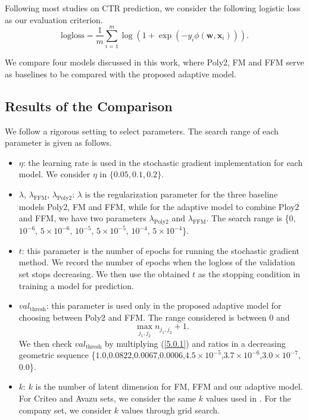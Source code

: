 Following most studies on CTR prediction, we consider the following logistic loss as our evaluation criterion.
\begin{equation}
\text{logloss}=\frac1{m}\sum_{i=1}^{m} \log(1+\exp(-y_{i}\phi(\boldsymbol{w}, \boldsymbol{x}_{i}))).
\end{equation}

We compare four models discussed in this work, where Poly2, FM and FFM serve as baselines to be compared with the proposed adaptive model.

\subsection{Results of the Comparison}
\label{sec:comparition}

We follow a rigorous setting to select parameters. The search range of each parameter is given as follows.
\begin{itemize}
\item $\eta$: the learning rate is used in the stochastic gradient  implementation for each model. We consider $\eta$ in $\{0.05,0.1,0.2\}$.
\item $\lambda$, $\lambda_{\text{FFM}}$, $\lambda_{\text{Poly2}}$: $\lambda$ is the regularization parameter for the three baseline models Poly2, FM and FFM, while for the adaptive model to combine Ploy2 and FFM, we have two parameters $\lambda_{\text{Poly2}}$ and $\lambda_{\text{FFM}}$. The search range is \{$0$, $10^{-6}$, $5\times10^{-6}$, $10^{-5}$, $5\times10^{-5}$, $10^{-4}$, $5\times10^{-4}$\}.
\item $t$: this parameter is the number of epochs for running the stochastic gradient method. We record the number of epochs when the logloss of the validation set stops decreasing. We then use the obtained $t$ as the stopping condition in training a model for prediction.
\item $val_{\text{thresh}}$: this parameter is used only in the proposed adaptive model for choosing between Poly2 and FFM. The range considered is between $0$ and
\begin{equation}
\label{5.0.1}
\max_{j_1,j_2} n_{j_1,j_2} +1.
\end{equation}
We then check $val_{\text{thresh}}$ by multiplying (\ref{5.0.1}) and ratios in a decreasing geometric sequence \{$1.0$,$0.0822$,$0.0067$,$0.0006$,$4.5\times10^{-5}$,$3.7\times10^{-6}$,$3.0\times10^{-7}$,$0.0$\}.

\item $k$: $k$ is the number of latent dimension for FM, FFM and our adaptive model. For Criteo and Avazu sets, we consider the same $k$ values used in \cite{Juan:2016:FFM:2959100.2959134}. For the company set, we consider $k$ values through grid search. 
\end{itemize}

